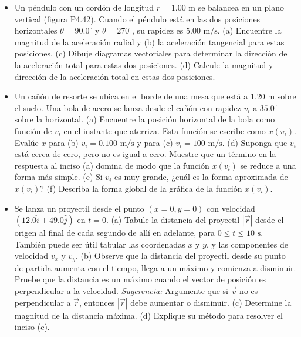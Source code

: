 \documentclass[11pt,a4paper]{article}
\begin{document}
\begin{itemize}
    \item[\textbf{42.}] Un péndulo con un cordón de longitud $r = 1.00 \text{ m}$ se balancea en un plano vertical (figura P4.42). Cuando el péndulo está en las dos posiciones horizontales $\theta = 90.0^\circ$ y $\theta = 270^\circ$, su rapidez es $5.00 \text{ m/s}$. (a) Encuentre la magnitud de la aceleración radial y (b) la aceleración tangencial para estas posiciones. (c) Dibuje diagramas vectoriales para determinar la dirección de la aceleración total para estas dos posiciones. (d) Calcule la magnitud y dirección de la aceleración total en estas dos posiciones.
    \vspace*{8cm}

    \item[\textbf{43.}] Un cañón de resorte se ubica en el borde de una mesa que está a $1.20 \text{ m}$ sobre el suelo. Una bola de acero se lanza desde el cañón con rapidez $v_i$ a $35.0^\circ$ sobre la horizontal. (a) Encuentre la posición horizontal de la bola como función de $v_i$ en el instante que aterriza. Esta función se escribe como $x(v_i)$. Evalúe $x$ para (b) $v_i = 0.100 \text{ m/s}$ y para (c) $v_i = 100 \text{ m/s}$. (d) Suponga que $v_i$ está cerca de cero, pero no es igual a cero. Muestre que un término en la respuesta al inciso (a) domina de modo que la función $x(v_i)$ se reduce a una forma más simple. (e) Si $v_i$ es muy grande, ¿cuál es la forma aproximada de $x(v_i)$? (f) Describa la forma global de la gráfica de la función $x(v_i)$.
    \vspace*{8cm}

    \item[\textbf{44.}] Se lanza un proyectil desde el punto $(x = 0, y = 0)$ con velocidad $(12.0\hat{i} + 49.0\hat{j})$ en $t = 0$. (a) Tabule la distancia del proyectil $|\vec{r}|$ desde el origen al final de cada segundo de allí en adelante, para $0 \le t \le 10 \text{ s}$. También puede ser útil tabular las coordenadas $x$ y $y$, y las componentes de velocidad $v_x$ y $v_y$. (b) Observe que la distancia del proyectil desde su punto de partida aumenta con el tiempo, llega a un máximo y comienza a disminuir. Pruebe que la distancia es un máximo cuando el vector de posición es perpendicular a la velocidad. \textit{Sugerencia:} Argumente que si $\vec{v}$ no es perpendicular a $\vec{r}$, entonces $|\vec{r}|$ debe aumentar o disminuir. (c) Determine la magnitud de la distancia máxima. (d) Explique su método para resolver el inciso (c).
    \vspace*{8cm}
\end{itemize}
\end{document}
